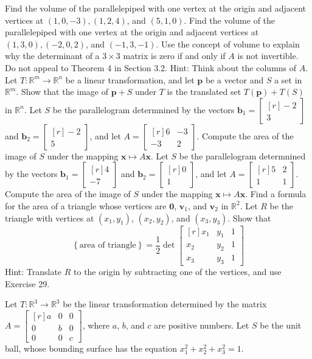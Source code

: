 \documentclass[11pt,answers]{exam} %
\renewcommand{\vec}[1]{\mathbf{#1}}
\newcommand{\mat}[1]{\begin{bmatrix*}[r] #1 \end{bmatrix*}}
\begin{document}
\begin{questions}
    \question Find the volume of the parallelepiped with one vertex at the origin and adjacent vertices at $(1,0,-3), (1,2,4)$, and $(5,1,0)$.
    \question Find the volume of the parallelepiped with one vertex at the origin and adjacent vertices at $(1,3,0), (-2,0,2)$, and $(-1,3,-1)$.
    \question Use the concept of volume to explain why the determinant of a $3 \times 3$ matrix is zero if and only if $A$ is not invertible. Do not appeal to Theorem 4 in Section 3.2. Hint: Think about the columns of $A$.
    \question Let $T:\mathbb{R}^m \rightarrow \mathbb{R}^n$ be a linear transformation, and let $\vec{p}$ be a vector and $S$ a set in $\mathbb{R}^m$. Show that the image of $\vec{p}+S$ under $T$ is the translated set $T(\vec{p})+T(S)$ in $\mathbb{R}^n$.
    \question Let $S$ be the parallelogram determnined by the vectors $\vec{b}_1 = \mat{-2\\3}$ and $\vec{b}_2 = \mat{-2\\5}$, and let $A = \mat{6 & -3 \\ -3 & 2}$. Compute the area of the image of $S$ under the mapping $\vec{x} \mapsto A\vec{x}$.
    \question Let $S$ be the parallelogram determnined by the vectors $\vec{b}_1 = \mat{4 \\ -7}$ and $\vec{b}_2 = \mat{0 \\ 1}$, and let $A = \mat{5 & 2 \\ 1 & 1}$. Compute the area of the image of $S$ under the mapping $\vec{x} \mapsto A\vec{x}$.
    \question Find a formula for the area of a triangle whose vertices are $\vec{0}$, $\vec{v}_1$, and $\vec{v}_2$ in $\mathbb{R}^2$.
    \question Let $R$ be the triangle with vertices at $(x_1,y_1)$, $(x_2,y_2)$, and $(x_3,y_3)$. Show that 
    \begin{equation*}
        \left\{\textrm{area of triangle} \right\} = \frac{1}{2} \det{\mat{x_1 & y_1 & 1 \\ x_2 & y_2 & 1 \\ x_3 & y_3 & 1}}
    \end{equation*}
    Hint: Translate $R$ to the origin by subtracting one of the vertices, and use Exercise 29.

    \question Let $T:\mathbb{R}^3 \rightarrow \mathbb{R}^3$ be the linear transformation determined by the matrix $A = \mat{a & 0 & 0 \\ 0 & b & 0 \\ 0 & 0 & c}$, where $a$, $b$, and $c$ are positive numbers. Let $S$ be the unit ball, whose bounding surface has the equation $x_1^2 + x_2^2 + x_3^2 = 1$.
    \begin{parts}

\end{parts}
\end{questions}
\end{document}
